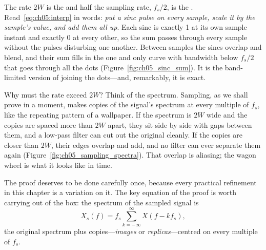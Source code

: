 The rate $2W$ is the  and half the sampling rate, $f_s/2$, is the
. Read~\eqref{eq:ch05:interp} in words: \emph{put a sinc pulse on every
sample, scale it by the sample's value, and add them all up}. Each sinc is exactly 1 at its own
sample instant and exactly 0 at every other, so the sum passes through every sample without the
pulses disturbing one another. Between samples the sincs overlap and blend, and their sum fills in
the one and only curve with bandwidth below $f_s/2$ that goes through all the dots
(Figure~\ref{fig:ch05_sinc_sum}). It is the band-limited version of joining the dots---and,
remarkably, it is exact.


Why must the rate exceed $2W$? Think of the spectrum. Sampling, as we shall prove in a moment,
makes copies of the signal's spectrum at every multiple of $f_s$, like the repeating pattern of a
wallpaper. If the spectrum is $2W$ wide and the copies are spaced more than $2W$ apart, they sit
side by side with gaps between them, and a low-pass filter can cut out the original cleanly. If
the copies are closer than $2W$, their edges overlap and add, and no filter can ever separate them
again (Figure~\ref{fig:ch05_sampling_spectra}). That overlap is aliasing; the wagon wheel is what
it looks like in time.

The proof deserves to be done carefully once, because every practical refinement in this chapter
is a variation on it. The key equation of the proof is worth carrying out of the box: the spectrum
of the sampled signal is
\begin{equation}
X_s(f)=f_s\sum_{k=-\infty}^{\infty}X(f-kf_s),
\label{eq:ch05:replicas}
\end{equation}
the original spectrum plus copies---\emph{images} or \emph{replicas}---centred on every multiple of
$f_s$.

